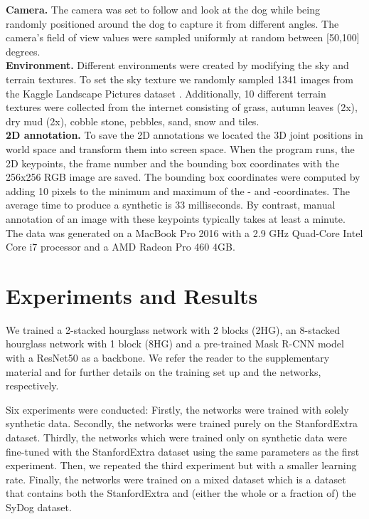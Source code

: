 \documentclass[final]{cvpr}
\begin{document}
\textbf{Camera.} The camera was set to follow and look at the dog while being randomly positioned around the dog to capture it from different angles. The camera's field of view values were sampled uniformly at random between [50,100] degrees.\\
\textbf{Environment.} Different environments were created by modifying the sky and terrain textures. To set the sky texture we randomly sampled 1341 images from the Kaggle Landscape Pictures dataset \cite{landscapedataset}. Additionally, 10 different terrain textures were collected from the internet consisting of grass, autumn leaves (2x), dry mud (2x), cobble stone, pebbles, sand, snow and tiles. \\\textbf{2D annotation.} To save the 2D annotations we located the 3D joint positions in world space and transform them into screen space. When the program runs, the 2D keypoints, the frame number and the bounding box coordinates with the 256x256 RGB image are saved. The bounding box coordinates were computed by adding 10 pixels to the minimum and maximum of the - and -coordinates. The average time to produce a synthetic is 33 milliseconds. By contrast, manual annotation of an image with these keypoints typically takes at least a minute. The data was generated on a MacBook Pro 2016 with a 2.9 GHz Quad-Core Intel Core i7 processor and a AMD Radeon Pro 460 4GB. 
\section{Experiments and Results}
We trained a 2-stacked hourglass network with 2 blocks (2HG), an 8-stacked hourglass network with 1 block (8HG) and a pre-trained Mask R-CNN model with a ResNet50 as a backbone. We refer the reader to the supplementary material and \cite{DBLP:journals/corr/HeGDG17, DBLP:journals/corr/NewellYD16} for further details on the training set up and the networks, respectively.

Six experiments were conducted: Firstly, the networks were trained with solely synthetic data. Secondly, the networks were trained purely on the StanfordExtra dataset. Thirdly, the networks which were trained only on synthetic data were fine-tuned with the StanfordExtra dataset using the same parameters as the first experiment. Then, we repeated the third experiment but with a smaller learning rate. Finally, the networks were trained on a mixed dataset which is a dataset that contains both the StanfordExtra and (either the whole or a fraction of) the SyDog dataset.
\end{document}
